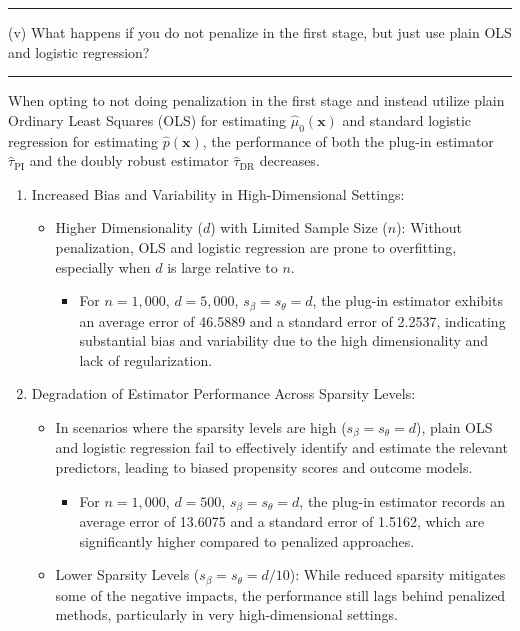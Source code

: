 \documentclass{article}
\newenvironment{colorparagraph}[1]{\par\color{#1}}{\par}
\begin{document}
\begin{colorparagraph}{questioncolor}
  \rule{\textwidth}{0.5pt}
  
  \vspace{.2cm}
(v) What happens if you do not penalize in the first stage, but just use plain OLS and logistic regression?

\rule{\textwidth}{0.5pt}
\end{colorparagraph}

When opting to not doing penalization in the first stage and instead utilize plain Ordinary Least Squares (OLS) for estimating \( \hat{\mu}_0(\mathbf{x}) \) and standard logistic regression for estimating \( \hat{p}(\mathbf{x}) \), the performance of both the plug-in estimator \( \hat{\tau}_{\text{PI}} \) and the doubly robust estimator \( \hat{\tau}_{\text{DR}} \) decreases.

\begin{enumerate}
  \item Increased Bias and Variability in High-Dimensional Settings:
    \begin{itemize}
      \item Higher Dimensionality (\( d \)) with Limited Sample Size (\( n \)): Without penalization, OLS and logistic regression are prone to overfitting, especially when \( d \) is large relative to \( n \).
        \begin{itemize}
          \item For \( n = 1,000 \), \( d = 5,000 \), \( s_\beta = s_\theta = d \), the plug-in estimator exhibits an average error of 46.5889 and a standard error of 2.2537, indicating substantial bias and variability due to the high dimensionality and lack of regularization.
        \end{itemize}
    \end{itemize}

  \item Degradation of Estimator Performance Across Sparsity Levels:
    \begin{itemize}
      \item In scenarios where the sparsity levels are high (\( s_\beta = s_\theta = d \)), plain OLS and logistic regression fail to effectively identify and estimate the relevant predictors, leading to biased propensity scores and outcome models.
        \begin{itemize}
          \item For \( n = 1,000 \), \( d = 500 \), \( s_\beta = s_\theta = d \), the plug-in estimator records an average error of 13.6075 and a standard error of 1.5162, which are significantly higher compared to penalized approaches.
        \end{itemize}
      \item Lower Sparsity Levels (\( s_\beta = s_\theta = d/10 \)): While reduced sparsity mitigates some of the negative impacts, the performance still lags behind penalized methods, particularly in very high-dimensional settings.
    \end{itemize}
  \end{enumerate}
\end{document}
